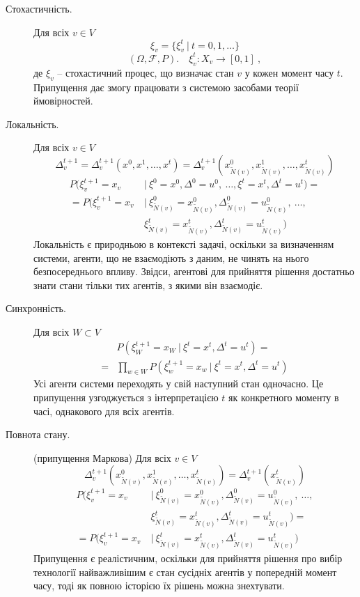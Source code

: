 \documentclass[oneside,14pt]{extarticle}
\begin{document}
\begin{description}

    \item[Стохастичність.] Для всіх \(v \in V\)
    \[ \xi_v = \{\xi^t_v\ |\ t = 0, 1, \ldots \}\] 
    \[ (\Omega, \mathcal{F}, P).\quad \xi_v^t : X_v \rightarrow [0, 1]\ ,\]
    де \( \xi_v \) – стохастичний процес, що визначає стан \(v\) у кожен момент часу \(t\). Припущення дає змогу працювати з системою засобами теорії ймовірностей.
    
    \item[Локальність.] Для всіх \(v \in V\) 
    \[\Delta_v^{t+1} = \Delta_v^{t+1}(x^0, x^1, \ldots, x^t) = \Delta_v^{t+1}(x_{\tilde{N}(v)}^0, x_{\tilde{N}(v)}^1, \ldots, x_{\tilde{N}(v)}^t)\]
    \begin{align*}
    P(\xi_v^{t+1} = x_v\ &|\ \xi^0 = x^0, \Delta^0 = u^0,\ \ldots, \xi^t = x^t, \Delta^t = u^t) = \\
	= P(\xi_v^{t+1} = x_v\ &|\ \xi_{\tilde N(v)}^0 = x_{\tilde N(v)}^0, \Delta_{\tilde N(v)}^0 = u_{\tilde N(v)}^0,\ \ldots,\\ &\xi_{\tilde N(v)}^t = x_{\tilde N(v)}^t, \Delta_{\tilde N(v)}^t = u_{\tilde N(v)}^t)
	\end{align*}
	Локальність є природньою в контексті задачі, оскільки за визначенням системи, агенти, що не взаємодіють з даним, не чинять на нього безпосереднього впливу. Звідси, агентові для прийняття рішення достатньо знати стани тільки тих агентів, з якими він взаємодіє.
	
    \item[Синхронність.] Для всіх \(W \subset V\)
    \begin{align*}
    &P(\xi^{t+1}_W = x_W\ |\ \xi^t = x^t, \Delta^t = u^t) = \\
    = &\prod_{w \in W} P(\xi^{t+1}_w = x_w\ |\ \xi^t = x^t, \Delta^t = u^t)
    \end{align*}
    Усі агенти системи переходять у свій наступний стан одночасно. Це припущення узгоджується з інтерпретацією \(t\) як конкретного моменту в часі, однакового для всіх агентів.
      
	\item[Повнота стану.] (припущення Маркова) Для всіх \(v \in V\)
	\[\Delta_v^{t+1}(x_{\tilde{N}(v)}^0, x_{\tilde{N}(v)}^1, \ldots, x_{\tilde{N}(v)}^t) = \Delta_v^{t+1}(x_{\tilde{N}(v)}^t)\]
	\begin{align*}
	P(\xi_v^{t+1} = x_v\ &|\ \xi_{\tilde N(v)}^0 = x_{\tilde N(v)}^0, \Delta_{\tilde N(v)}^0 = u_{\tilde N(v)}^0,\ \ldots,\\ &\xi_{\tilde N(v)}^t = x_{\tilde N(v)}^t, \Delta_{\tilde N(v)}^t = u_{\tilde N(v)}^t) = \\
	= P(\xi_v^{t+1} = x_v\ & |\ \xi_{\tilde N(v)}^t = x_{\tilde N(v)}^t, \Delta_{\tilde N(v)}^t = u_{\tilde N(v)}^t)
	\end{align*}
	Припущення є реалістичним, оскільки для прийняття рішення про вибір технології найважливішим є стан сусідніх агентів у попередній момент часу, тоді як повною історією їх рішень можна знехтувати.
	

\end{description}
\end{document}
